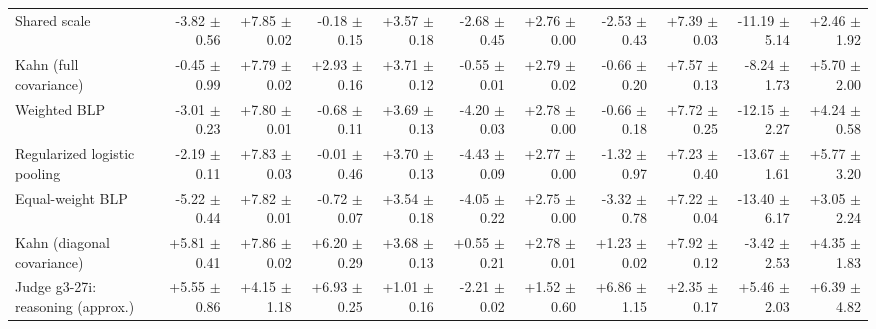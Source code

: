 \begin{tabular}{lrrrrrrrrrr}
Shared scale & -3.82 {\scriptsize $\pm$ 0.56} & +7.85 {\scriptsize $\pm$ 0.02} & -0.18 {\scriptsize $\pm$ 0.15} & +3.57 {\scriptsize $\pm$ 0.18} & -2.68 {\scriptsize $\pm$ 0.45} & +2.76 {\scriptsize $\pm$ 0.00} & -2.53 {\scriptsize $\pm$ 0.43} & +7.39 {\scriptsize $\pm$ 0.03} & -11.19 {\scriptsize $\pm$ 5.14} & +2.46 {\scriptsize $\pm$ 1.92} \\
Kahn (full covariance) & -0.45 {\scriptsize $\pm$ 0.99} & +7.79 {\scriptsize $\pm$ 0.02} & +2.93 {\scriptsize $\pm$ 0.16} & +3.71 {\scriptsize $\pm$ 0.12} & -0.55 {\scriptsize $\pm$ 0.01} & +2.79 {\scriptsize $\pm$ 0.02} & -0.66 {\scriptsize $\pm$ 0.20} & +7.57 {\scriptsize $\pm$ 0.13} & -8.24 {\scriptsize $\pm$ 1.73} & +5.70 {\scriptsize $\pm$ 2.00} \\
Weighted BLP & -3.01 {\scriptsize $\pm$ 0.23} & +7.80 {\scriptsize $\pm$ 0.01} & -0.68 {\scriptsize $\pm$ 0.11} & +3.69 {\scriptsize $\pm$ 0.13} & -4.20 {\scriptsize $\pm$ 0.03} & +2.78 {\scriptsize $\pm$ 0.00} & -0.66 {\scriptsize $\pm$ 0.18} & +7.72 {\scriptsize $\pm$ 0.25} & -12.15 {\scriptsize $\pm$ 2.27} & +4.24 {\scriptsize $\pm$ 0.58} \\
Regularized logistic pooling & -2.19 {\scriptsize $\pm$ 0.11} & +7.83 {\scriptsize $\pm$ 0.03} & -0.01 {\scriptsize $\pm$ 0.46} & +3.70 {\scriptsize $\pm$ 0.13} & -4.43 {\scriptsize $\pm$ 0.09} & +2.77 {\scriptsize $\pm$ 0.00} & -1.32 {\scriptsize $\pm$ 0.97} & +7.23 {\scriptsize $\pm$ 0.40} & -13.67 {\scriptsize $\pm$ 1.61} & +5.77 {\scriptsize $\pm$ 3.20} \\
Equal-weight BLP & -5.22 {\scriptsize $\pm$ 0.44} & +7.82 {\scriptsize $\pm$ 0.01} & -0.72 {\scriptsize $\pm$ 0.07} & +3.54 {\scriptsize $\pm$ 0.18} & -4.05 {\scriptsize $\pm$ 0.22} & +2.75 {\scriptsize $\pm$ 0.00} & -3.32 {\scriptsize $\pm$ 0.78} & +7.22 {\scriptsize $\pm$ 0.04} & -13.40 {\scriptsize $\pm$ 6.17} & +3.05 {\scriptsize $\pm$ 2.24} \\
Kahn (diagonal covariance) & +5.81 {\scriptsize $\pm$ 0.41} & +7.86 {\scriptsize $\pm$ 0.02} & +6.20 {\scriptsize $\pm$ 0.29} & +3.68 {\scriptsize $\pm$ 0.13} & +0.55 {\scriptsize $\pm$ 0.21} & +2.78 {\scriptsize $\pm$ 0.01} & +1.23 {\scriptsize $\pm$ 0.02} & +7.92 {\scriptsize $\pm$ 0.12} & -3.42 {\scriptsize $\pm$ 2.53} & +4.35 {\scriptsize $\pm$ 1.83} \\
Judge g3-27i: reasoning (approx.) & +5.55 {\scriptsize $\pm$ 0.86} & +4.15 {\scriptsize $\pm$ 1.18} & +6.93 {\scriptsize $\pm$ 0.25} & +1.01 {\scriptsize $\pm$ 0.16} & -2.21 {\scriptsize $\pm$ 0.02} & +1.52 {\scriptsize $\pm$ 0.60} & +6.86 {\scriptsize $\pm$ 1.15} & +2.35 {\scriptsize $\pm$ 0.17} & +5.46 {\scriptsize $\pm$ 2.03} & +6.39 {\scriptsize $\pm$ 4.82} \\

\end{tabular}
